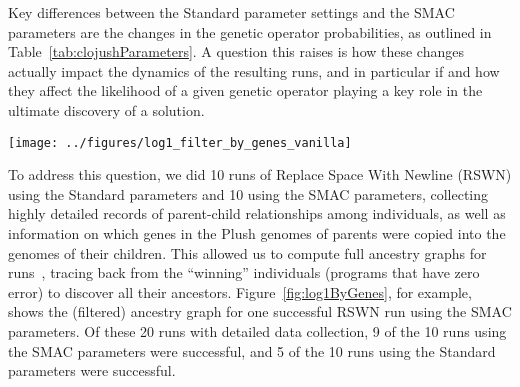 Key differences between the Standard parameter settings and the SMAC parameters
are the changes in the genetic operator probabilities, as outlined in
Table~\ref{tab:clojushParameters}. 
A question this raises is how these changes
actually impact the dynamics of the resulting runs, and in particular if and
how they affect the likelihood of a given genetic operator playing a key
role in the ultimate discovery of a solution.


\begin{figure*}
	\texttt{[image: ../figures/log1\_filter\_by\_genes\_vanilla]}
	\caption{Ancestry graph of a successful Replace Space With Newline run
	using the ``tuned'' parameters discovered by SMAC. This tree is filtered 
	to only include individuals that ultimately passed a gene
	on to the winning individual. Each individual is represented as a
	rectangle whose width is proportional to the number of selections
	it received, and whose color is a function of its error vector.
	Edges indicate parent-child relationships. Dashed black edges indicate
	that the child was constructed via alternation alone; solid black edges 
	indicate alternation followed by uniform mutation. Solid orange edges
	indicate applications of uniform mutation, and dashed orange represent
	applications of uniform close mutation.}
	\label{fig:log1ByGenes}
\end{figure*}

To address this question, we did 10 runs of Replace Space With Newline (RSWN) 
using the Standard parameters and 10 using the SMAC parameters, 
collecting highly detailed records of parent-child relationships 
among individuals, as well as information on which genes in the Plush 
genomes of parents were copied into
the genomes of their children. This allowed us to compute full ancestry
graphs for 
runs~\cite{McPhee:2016:VGP:2908961.2931741,McPhee:2015:GPTP,McPhee:2016:GPTP},
tracing back from the ``winning'' individuals (programs that have zero error)
to discover all their ancestors. Figure~\ref{fig:log1ByGenes}, for example,
shows the (filtered) ancestry graph for one successful RSWN run 
using the SMAC parameters. Of these 20 runs with detailed data collection,
9 of the 10 runs using the SMAC parameters were successful, and 5 of the
10 runs using the Standard parameters were successful.

